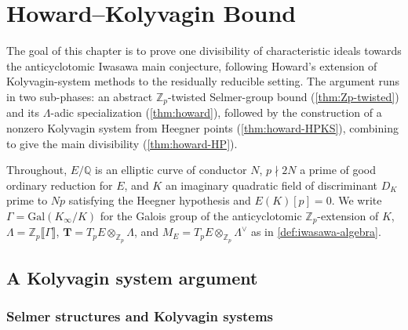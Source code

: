 \providecommand{\Fcal}{\mathcal{F}}
\providecommand{\rH}{\mathrm{H}}

\chapter{Howard--Kolyvagin Bound}
\label{chap:howard-kolyvagin}


The goal of this chapter is to prove one divisibility of characteristic ideals towards the anticyclotomic Iwasawa main conjecture, following Howard's extension of Kolyvagin-system methods to the residually reducible setting. The argument runs in two sub-phases: an abstract \(\mathbb{Z}_p\)-twisted Selmer-group bound (\cref{thm:Zp-twisted}) and its \(\Lambda\)-adic specialization (\cref{thm:howard}), followed by the construction of a nonzero Kolyvagin system from Heegner points (\cref{thm:howard-HPKS}), combining to give the main divisibility (\cref{thm:howard-HP}).

Throughout, \(E/\mathbb{Q}\) is an elliptic curve of conductor \(N\), \(p \nmid 2N\) a prime of good ordinary reduction for \(E\), and \(K\) an imaginary quadratic field of discriminant \(D_K\) prime to \(Np\) satisfying the Heegner hypothesis and \(E(K)[p] = 0\). We write \(\Gamma = \mathrm{Gal}(K_\infty/K)\) for the Galois group of the anticyclotomic \(\mathbb{Z}_p\)-extension of \(K\), \(\Lambda = \mathbb{Z}_p\llbracket\Gamma\rrbracket\), \(\mathbf{T} = T_p E \otimes_{\mathbb{Z}_p} \Lambda\), and \(M_E = T_p E \otimes_{\mathbb{Z}_p} \Lambda^\vee\) as in \cref{def:iwasawa-algebra}.

\section{A Kolyvagin system argument}

\subsection{Selmer structures and Kolyvagin systems}

